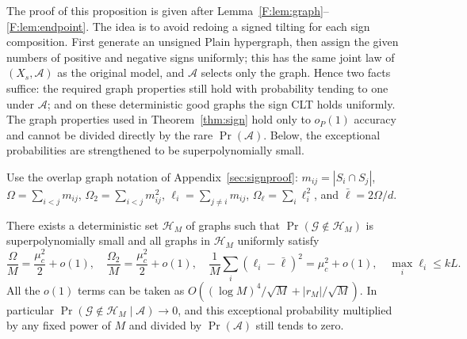 The proof of this proposition is given after Lemma~\ref{F:lem:graph}--\ref{F:lem:endpoint}. The
idea is to avoid redoing a signed tilting for each sign composition. First generate an unsigned
Plain hypergraph, then assign the given numbers of positive and negative signs uniformly; this has
the same joint law of $(X_s,\mathcal A)$ as the original model, and $\mathcal A$ selects only the
graph. Hence two facts suffice: the required graph properties still hold with probability tending
to one under $\mathcal A$; and on these deterministic good graphs the sign CLT holds uniformly.
The graph properties used in Theorem~\ref{thm:sign} hold only to $o_P(1)$ accuracy and cannot be
divided directly by the rare $\Pr(\mathcal A)$. Below, the exceptional probabilities are
strengthened to be superpolynomially small.

Use the overlap graph notation of Appendix~\ref{sec:signproof}: $m_{ij}=|S_i\cap S_j|$,
$\Omega=\sum_{i<j}m_{ij}$, $\Omega_2=\sum_{i<j}m_{ij}^2$, $\ell_i=\sum_{j\ne i}m_{ij}$,
$\Omega_\ell=\sum_i\ell_i^2$, and $\bar\ell=2\Omega/d$.

\begin{lemma}\label{F:lem:graph}
There exists a deterministic set $\mathcal H_M$ of graphs such that
$\Pr(\mathcal G\notin\mathcal H_M)$ is superpolynomially small and all graphs in $\mathcal H_M$
uniformly satisfy
\begin{equation}
\frac\Omega M=\frac{\mu_c^2}2+o(1),\quad\frac{\Omega_2}M=\frac{\mu_c^2}2+o(1),\quad\frac1M\sum_i(\ell_i-\bar\ell)^2=\mu_c^2+o(1),\quad\max_i\ell_i\le kL.\label{F:goodgraph}
\end{equation}
All the $o(1)$ terms can be taken as $O((\log M)^4/\sqrt M+|r_M|/\sqrt M)$. In particular
$\Pr(\mathcal G\notin\mathcal H_M\mid \mathcal A)\to0$, and this exceptional probability
multiplied by any fixed power of $M$ and divided by $\Pr(\mathcal A)$ still tends to zero.
\end{lemma}

